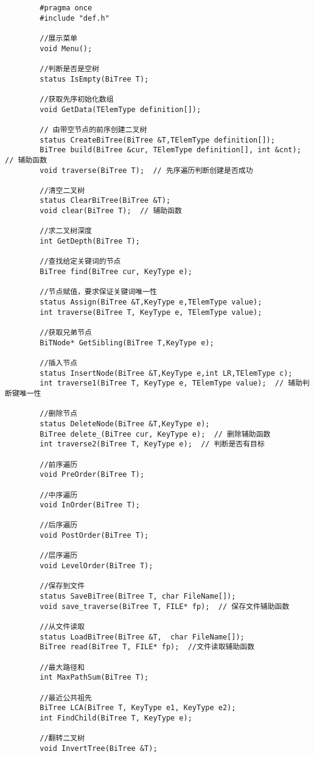 \documentclass[supercite]{Experimental_Report}
\begin{document}
	\begin{lstlisting}
		#pragma once
		#include "def.h"
		
		//展示菜单
		void Menu();
		
		//判断是否是空树
		status IsEmpty(BiTree T);
		
		//获取先序初始化数组
		void GetData(TElemType definition[]);
		
		// 由带空节点的前序创建二叉树
		status CreateBiTree(BiTree &T,TElemType definition[]);
		BiTree build(BiTree &cur, TElemType definition[], int &cnt);  // 辅助函数
		void traverse(BiTree T);  // 先序遍历判断创建是否成功
		
		//清空二叉树
		status ClearBiTree(BiTree &T);
		void clear(BiTree T);  // 辅助函数
		
		//求二叉树深度
		int GetDepth(BiTree T);
		
		//查找给定关键词的节点
		BiTree find(BiTree cur, KeyType e);
		
		//节点赋值，要求保证关键词唯一性
		status Assign(BiTree &T,KeyType e,TElemType value);
		int traverse(BiTree T, KeyType e, TElemType value);
		
		//获取兄弟节点
		BiTNode* GetSibling(BiTree T,KeyType e);
		
		//插入节点
		status InsertNode(BiTree &T,KeyType e,int LR,TElemType c);
		int traverse1(BiTree T, KeyType e, TElemType value);  // 辅助判断键唯一性
		
		//删除节点
		status DeleteNode(BiTree &T,KeyType e);
		BiTree delete_(BiTree cur, KeyType e);  // 删除辅助函数
		int traverse2(BiTree T, KeyType e);  // 判断是否有目标
		
		//前序遍历
		void PreOrder(BiTree T);
		
		//中序遍历
		void InOrder(BiTree T);
		
		//后序遍历
		void PostOrder(BiTree T);
		
		//层序遍历
		void LevelOrder(BiTree T);
		
		//保存到文件
		status SaveBiTree(BiTree T, char FileName[]);
		void save_traverse(BiTree T, FILE* fp);  // 保存文件辅助函数
		
		//从文件读取
		status LoadBiTree(BiTree &T,  char FileName[]);
		BiTree read(BiTree T, FILE* fp);  //文件读取辅助函数
		
		//最大路径和
		int MaxPathSum(BiTree T);
		
		//最近公共祖先
		BiTree LCA(BiTree T, KeyType e1, KeyType e2);
		int FindChild(BiTree T, KeyType e);
		
		//翻转二叉树
		void InvertTree(BiTree &T);
	\end{lstlisting}
\end{document}
